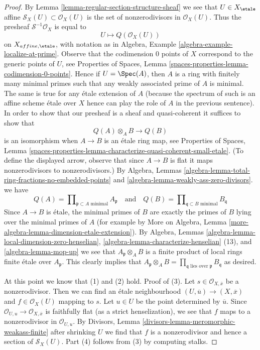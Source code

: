 \begin{proof}
By Lemma \ref{lemma-regular-section-structure-sheaf}
we see that $U \in X_\etale$ affine
$\mathcal{S}_X(U) \subset \mathcal{O}_X(U)$
is the set of nonzerodivisors in $\mathcal{O}_X(U)$.
Thus the presheaf $\mathcal{S}^{-1}\mathcal{O}_X$ is equal to
$$
U \longmapsto Q(\mathcal{O}_X(U))
$$
on $X_{affine, \etale}$, with notation as in
Algebra, Example \ref{algebra-example-localize-at-prime}.
Observe that the codimension $0$ points of $X$ correspond
to the generic points of $U$, see
Properties of Spaces, Lemma \ref{spaces-properties-lemma-codimension-0-points}.
Hence if $U = \Spec(A)$, then $A$ is a ring with finitely many minimal primes
such that any weakly associated prime of $A$ is minimal.
The same is true for any \'etale extension of $A$ (because the
spectrum of such is an affine scheme \'etale over $X$ hence can
play the role of $A$ in the previous sentence).
In order to show that our presheaf is a sheaf and quasi-coherent
it suffices to show that
$$
Q(A) \otimes_A B \longrightarrow Q(B)
$$
is an isomorphism when $A \to B$ is an \'etale ring map, see
Properties of Spaces, Lemma
\ref{spaces-properties-lemma-characterize-quasi-coherent-small-etale}.
(To define the displayed arrow, observe that since $A \to B$
is flat it maps nonzerodivisors to nonzerodivisors.)
By Algebra, Lemmas
\ref{algebra-lemma-total-ring-fractions-no-embedded-points} and
\ref{algebra-lemma-weakly-ass-zero-divisors}.
we have
$$
Q(A) = \prod\nolimits_{\mathfrak p \subset A\text{ minimal}} A_\mathfrak p
\quad\text{and}\quad
Q(B) = \prod\nolimits_{\mathfrak q \subset B\text{ minimal}} B_\mathfrak q
$$
Since $A \to B$ is \'etale, the minimal primes of $B$ are exactly the
primes of $B$ lying over the minimal primes
of $A$ (for example by More on Algebra, Lemma
\ref{more-algebra-lemma-dimension-etale-extension}).
By Algebra, Lemmas \ref{algebra-lemma-local-dimension-zero-henselian},
\ref{algebra-lemma-characterize-henselian} (13), and
\ref{algebra-lemma-mop-up} we see that $A_\mathfrak p \otimes_A B$
is a finite product of local rings finite \'etale over $A_\mathfrak p$.
This clearly implies that $A_\mathfrak p \otimes_A B =
\prod_{\mathfrak q\text{ lies over }\mathfrak p} B_\mathfrak q$
as desired.

\medskip\noindent
At this point we know that (1) and (2) hold.
Proof of (3). Let $s \in \mathcal{O}_{X, \overline{x}}$
be a nonzerodivisor. Then we can find an \'etale neighbourhood
$(U, \overline{u}) \to (X, \overline{x})$
and $f \in \mathcal{O}_X(U)$ mapping to $s$.
Let $u \in U$ be the point determined by $\overline{u}$.
Since $\mathcal{O}_{U, u} \to \mathcal{O}_{X, \overline{x}}$
is faithfully flat (as a strict henselization), we see that
$f$ maps to a nonzerodivisor in $\mathcal{O}_{U, u}$.
By Divisors, Lemma \ref{divisors-lemma-meromorphic-weakass-finite}
after shrinking $U$ we find that $f$ is a nonzerodivisor
and hence a section of $\mathcal{S}_X(U)$.
Part (4) follows from (3) by computing stalks.
\end{proof}

